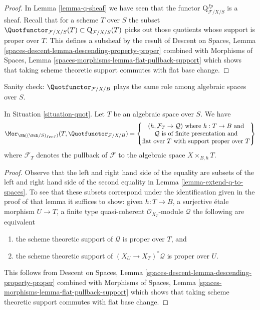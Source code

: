 \begin{proof}
In Lemma \ref{lemma-q-sheaf} we have seen that the functor
$\text{Q}^{fp}_{\mathcal{F}/X/S}$ is a sheaf. Recall that for a
scheme $T$ over $S$ the subset
$\Quotfunctor_{\mathcal{F}/X/S}(T) \subset \text{Q}_{\mathcal{F}/X/S}(T)$
picks out those quotients whose support is proper over $T$.
This defines a subsheaf by the result of
Descent on Spaces, Lemma \ref{spaces-descent-lemma-descending-property-proper}
combined with
Morphisms of Spaces, Lemma \ref{spaces-morphisms-lemma-flat-pullback-support}
which shows that taking scheme theoretic support commutes
with flat base change.
\end{proof}

\noindent
Sanity check: $\Quotfunctor_{\mathcal{F}/X/B}$
plays the same role among algebraic spaces
over $S$.

\begin{lemma}
\label{lemma-extend-quot-to-spaces}
In Situation \ref{situation-quot}. Let $T$ be an algebraic space over $S$.
We have
$$
\Mor_{\Sh((\Sch/S)_{fppf})}(T,  \Quotfunctor_{\mathcal{F}/X/B}) =
\left\{
\begin{matrix}
(h, \mathcal{F}_T \to \mathcal{Q}) \text{ where }
h : T \to B \text{ and}\\
\mathcal{Q}\text{ is of finite presentation and}\\
\text{flat over }T\text{ with support proper over }T
\end{matrix}
\right\}
$$
where $\mathcal{F}_T$ denotes the pullback of $\mathcal{F}$
to the algebraic space $X \times_{B, h} T$.
\end{lemma}

\begin{proof}
Observe that the left and right hand side of the equality are
subsets of the left and right hand side of the second equality in
Lemma \ref{lemma-extend-q-to-spaces}.
To see that these subsets correspond under
the identification given in the proof of that lemma
it suffices to show: given $h : T \to B$,
a surjective \'etale morphism $U \to T$,
a finite type quasi-coherent $\mathcal{O}_{X_T}$-module $\mathcal{Q}$
the following are equivalent
\begin{enumerate}
\item the scheme theoretic support of $\mathcal{Q}$ is proper
over $T$, and
\item the scheme theoretic support of $(X_U \to X_T)^*\mathcal{Q}$
is proper over $U$.
\end{enumerate}
This follows from
Descent on Spaces, Lemma \ref{spaces-descent-lemma-descending-property-proper}
combined with
Morphisms of Spaces, Lemma \ref{spaces-morphisms-lemma-flat-pullback-support}
which shows that taking scheme theoretic support commutes
with flat base change.
\end{proof}

